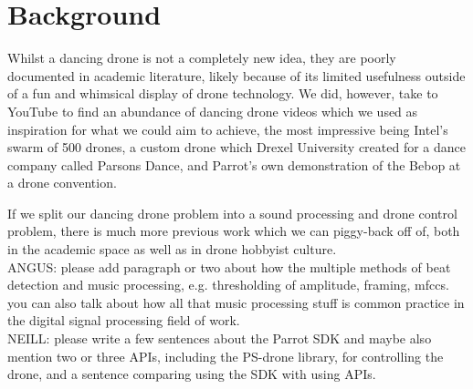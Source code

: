 \section{Background}

Whilst a dancing drone is not a completely new idea, they are poorly documented in academic literature, likely because of its limited usefulness outside of a fun and whimsical display of drone technology. We did, however, take to YouTube to find an abundance of dancing drone videos which we used as inspiration for what we could aim to achieve, the most impressive being Intel's swarm of 500 drones, a custom drone which Drexel University created for a dance company called Parsons Dance, and Parrot's own demonstration of the Bebop at a drone convention.


If we split our dancing drone problem into a sound processing and drone control problem, there is much more previous work which we can piggy-back off of, both in the academic space as well as in drone hobbyist culture.\\

ANGUS: please add paragraph or two about how the multiple methods of beat detection and music processing, e.g. thresholding of amplitude, framing, mfccs. you can also talk about how all that music processing stuff is common practice in the digital signal processing field of work.\\

NEILL: please write a few sentences about the Parrot SDK and maybe also mention two or three APIs, including the PS-drone library, for controlling the drone, and a sentence comparing using the SDK with using APIs.